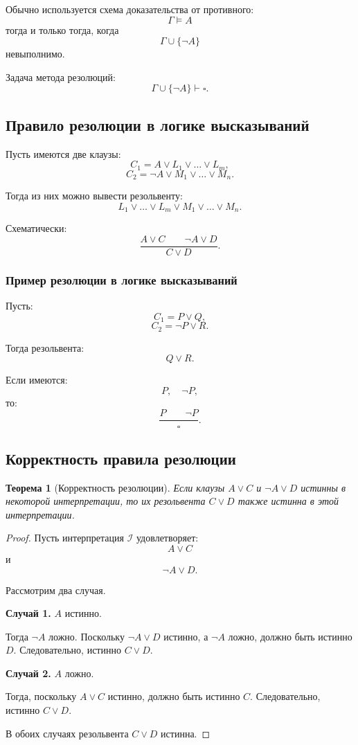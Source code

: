 \documentclass[12pt,a4paper]{article}
\newtheorem{theorem}{Теорема}
\begin{document}
Обычно используется схема доказательства от противного:
$$
\Gamma \models A
$$
тогда и только тогда, когда
$$
\Gamma \cup \{\neg A\}
$$
невыполнимо.

Задача метода резолюций:
$$
\Gamma \cup \{\neg A\} \vdash \square.
$$

\subsection{Правило резолюции в логике высказываний}

Пусть имеются две клаузы:
$$
C_1 = A \lor L_1 \lor \dots \lor L_m,
$$
$$
C_2 = \neg A \lor M_1 \lor \dots \lor M_n.
$$

Тогда из них можно вывести резольвенту:
$$
L_1 \lor \dots \lor L_m \lor M_1 \lor \dots \lor M_n.
$$

Схематически:
$$
\frac{A \lor C \qquad \neg A \lor D}{C \lor D}.
$$

\subsubsection{Пример резолюции в логике высказываний}

Пусть:
$$
C_1 = P \lor Q,
$$
$$
C_2 = \neg P \lor R.
$$

Тогда резольвента:
$$
Q \lor R.
$$

Если имеются:
$$
P,\quad \neg P,
$$
то:
$$
\frac{P \qquad \neg P}{\square}.
$$

\subsection{Корректность правила резолюции}

\begin{theorem}[Корректность резолюции]
Если клаузы $A \lor C$ и $\neg A \lor D$ истинны в некоторой интерпретации, то их резольвента $C \lor D$ также истинна в этой интерпретации.
\end{theorem}

\begin{proof}
Пусть интерпретация $\mathcal{I}$ удовлетворяет:
$$
A \lor C
$$
и
$$
\neg A \lor D.
$$

Рассмотрим два случая.

\textbf{Случай 1.} $A$ истинно.

Тогда $\neg A$ ложно. Поскольку $\neg A \lor D$ истинно, а $\neg A$ ложно, должно быть истинно $D$. Следовательно, истинно $C \lor D$.

\textbf{Случай 2.} $A$ ложно.

Тогда, поскольку $A \lor C$ истинно, должно быть истинно $C$. Следовательно, истинно $C \lor D$.

В обоих случаях резольвента $C \lor D$ истинна.
\end{proof}
\end{document}
